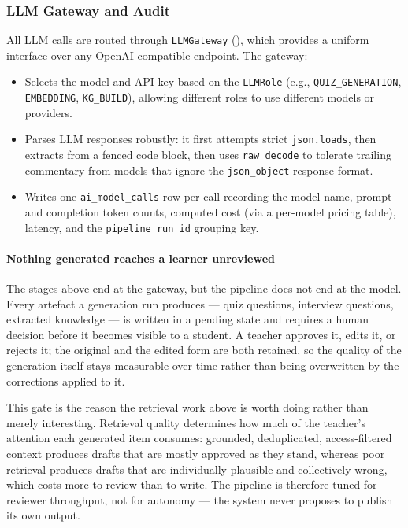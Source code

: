\subsubsection{LLM Gateway and Audit}
\label{sec:impl_llm_gateway}

All LLM calls are routed through \texttt{LLMGateway} (), which provides a uniform interface over any OpenAI-compatible endpoint. The gateway:
\begin{itemize}
    \item Selects the model and API key based on the \texttt{LLMRole} (e.g., \texttt{QUIZ\_GENERATION}, \texttt{EMBEDDING}, \texttt{KG\_BUILD}), allowing different roles to use different models or providers.
    \item Parses LLM responses robustly: it first attempts strict \texttt{json.loads}, then extracts from a fenced code block, then uses \texttt{raw\_decode} to tolerate trailing commentary from models that ignore the \texttt{json\_object} response format.
    \item Writes one \texttt{ai\_model\_calls} row per call recording the model name, prompt and completion token counts, computed cost (via a per-model pricing table), latency, and the \texttt{pipeline\_run\_id} grouping key.
\end{itemize}

\paragraph{Nothing generated reaches a learner unreviewed}
The stages above end at the gateway, but the pipeline does not end at the model. Every artefact a generation run produces --- quiz questions, interview questions, extracted knowledge --- is written in a pending state and requires a human decision before it becomes visible to a student. A teacher approves it, edits it, or rejects it; the original and the edited form are both retained, so the quality of the generation itself stays measurable over time rather than being overwritten by the corrections applied to it.

This gate is the reason the retrieval work above is worth doing rather than merely interesting. Retrieval quality determines how much of the teacher's attention each generated item consumes: grounded, deduplicated, access-filtered context produces drafts that are mostly approved as they stand, whereas poor retrieval produces drafts that are individually plausible and collectively wrong, which costs more to review than to write. The pipeline is therefore tuned for reviewer throughput, not for autonomy --- the system never proposes to publish its own output.
